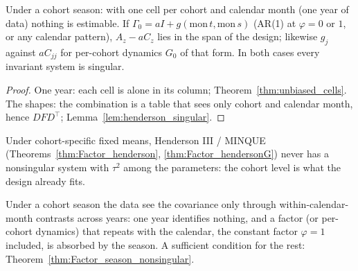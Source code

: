 \begin{theorem}\label{thm:Factor_season_collapse}
  \leanok
  Under a cohort season: with one cell per cohort and calendar month (one year of data) nothing
  is estimable. If $\Gamma_0 = aI + g(\mathrm{mon}\,t, \mathrm{mon}\,s)$ (AR(1) at $\varphi = 0$
  or $1$, or any calendar pattern), $A_z - aC_z$ lies in the span of the design; likewise $g_j$
  against $aC_{jj}$ for per-cohort dynamics $G_0$ of that form. In both cases every invariant
  system is singular.
\end{theorem}
\begin{proof}
  \leanok
  One year: each cell is alone in its column; Theorem~\ref{thm:unbiased_cells}. The shapes:
  the combination is a table that sees only cohort and calendar month, hence $DFD^\top$;
  Lemma~\ref{lem:henderson_singular}.
\end{proof}

\begin{remark}[Finding 27]
  Under cohort-specific fixed means, Henderson III / MINQUE (Theorems~\ref{thm:Factor_henderson},
  \ref{thm:Factor_hendersonG}) never has a nonsingular system with $\tau^2$ among the
  parameters: the cohort level is what the design already fits.
\end{remark}

\begin{remark}[Finding 28]
  Under a cohort season the data see the covariance only through within-calendar-month
  contrasts across years: one year identifies nothing, and a factor (or per-cohort dynamics)
  that repeats with the calendar, the constant factor $\varphi = 1$ included, is absorbed by
  the season. A sufficient condition for the rest: Theorem~\ref{thm:Factor_season_nonsingular}.
\end{remark}

